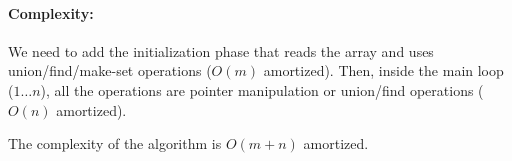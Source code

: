 \documentclass[a4paper]{article}
\begin{document}
\paragraph{Complexity: } We need to add the initialization phase that reads the array and uses union/find/make-set operations ($O(m)$ amortized).
Then, inside the main loop ($1 \ldots n$), all the operations are pointer manipulation or union/find operations ($O(n)$ amortized).

The complexity of the algorithm is $O(m+n)$ amortized. 
\end{document}
